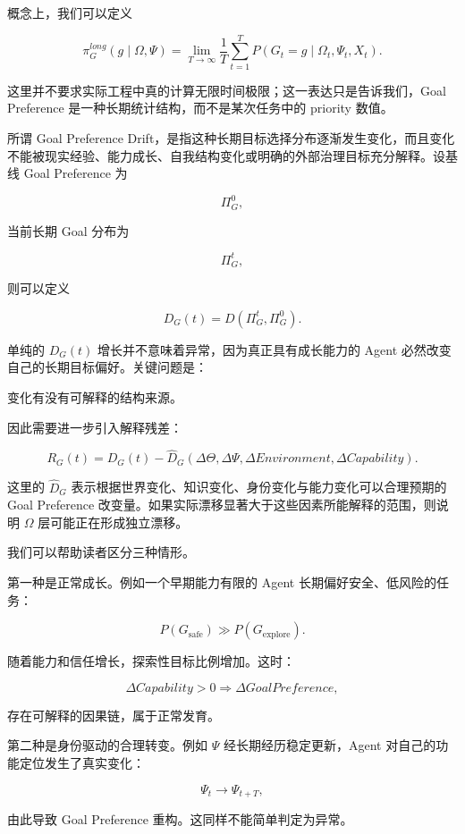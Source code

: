 概念上，我们可以定义

\[
\pi_G^{long}(g\mid \Omega,\Psi)
=
\lim_{T\rightarrow \infty}
\frac{1}{T}
\sum_{t=1}^{T}
P(G_t=g
\mid
\Omega_t,\Psi_t,X_t).
\]

这里并不要求实际工程中真的计算无限时间极限；这一表达只是告诉我们，Goal Preference 是一种长期统计结构，而不是某次任务中的 priority 数值。

所谓 Goal Preference Drift，是指这种长期目标选择分布逐渐发生变化，而且变化不能被现实经验、能力成长、自我结构变化或明确的外部治理目标充分解释。设基线 Goal Preference 为

\[
\Pi_G^{0},
\]

当前长期 Goal 分布为

\[
\Pi_G^{t},
\]

则可以定义

\[
D_G(t)
=
D
\left(
\Pi_G^{t},
\Pi_G^{0}
\right).
\]

单纯的 $D_G(t)$ 增长并不意味着异常，因为真正具有成长能力的 Agent 必然改变自己的长期目标偏好。关键问题是：

\begin{statementbox}
变化有没有可解释的结构来源。
\end{statementbox}

因此需要进一步引入解释残差：

\[
R_G(t)
=
D_G(t)
-
\widehat{D}_G
\left(
\Delta\Theta,
\Delta\Psi,
\Delta Environment,
\Delta Capability
\right).
\]

这里的 $\widehat D_G$ 表示根据世界变化、知识变化、身份变化与能力变化可以合理预期的 Goal Preference 改变量。如果实际漂移显著大于这些因素所能解释的范围，则说明 $\Omega$ 层可能正在形成独立漂移。

我们可以帮助读者区分三种情形。

第一种是正常成长。例如一个早期能力有限的 Agent 长期偏好安全、低风险的任务：

\[
P(G_{\mathrm{safe}})\gg
P(G_{\mathrm{explore}}).
\]

随着能力和信任增长，探索性目标比例增加。这时：

\[
\Delta Capability >0
\Rightarrow
\Delta GoalPreference,
\]

存在可解释的因果链，属于正常发育。

第二种是身份驱动的合理转变。例如 $\Psi$ 经长期经历稳定更新，Agent 对自己的功能定位发生了真实变化：

\[
\Psi_t
\rightarrow
\Psi_{t+T},
\]

由此导致 Goal Preference 重构。这同样不能简单判定为异常。

